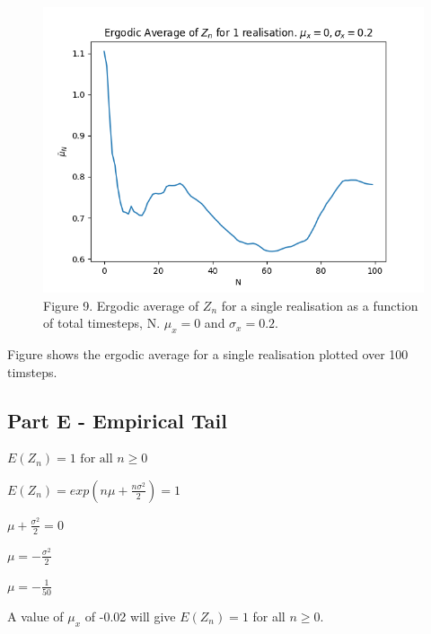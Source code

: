 \documentclass{article}
\begin{document}
\begin{figure}[H]
\includegraphics[scale=0.8]{ergodic_average_a.png} 
\small{Figure 9. Ergodic average of $Z_n$ for a single realisation as a function of total timesteps, N. $\mu_x=0$ and $\sigma_x=0.2$.}
\end{figure}

Figure shows the ergodic average for a single realisation plotted over 100 timsteps. 

\subsection{Part E - Empirical Tail}

$E(Z_n) = 1 \text{ for all } n\geq0$

$E(Z_n) = exp(n\mu + \frac{n\sigma^2}{2}) = 1$

$\mu + \frac{\sigma^2}{2} = 0$

$\mu = - \frac{\sigma^2}{2}$

$\mu = -\frac{1}{50}$

A value of $\mu_x$ of -0.02 will give $E(Z_n)=1$ for all $n \geq 0$.
\end{document}
